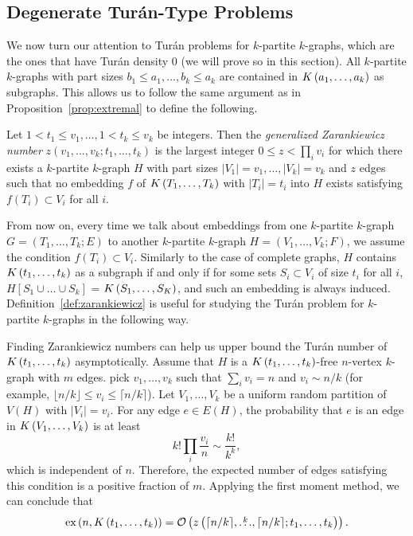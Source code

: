 \subsection{Degenerate Turán-Type Problems}\label{subsec:degenerate}

We now turn our attention to Turán problems for $k$-partite $k$-graphs,
which are the ones that have Turán density $0$ (we will prove so in this section).
All $k$-partite $k$-graphs with part sizes $b_1 \leq a_1, \dots, b_k \leq a_k$
are contained in $K\left(a_1, \dots, a_k\right)$ as subgraphs.
This allows us to follow the same argument as in Proposition~\ref{prop:extremal}
to define the following.

\begin{definition}\label{def:zarankiewicz}
    Let $1 < t_1 \leq v_1, \dots, 1 < t_k \leq v_k$ be integers.
    Then the \emph{generalized Zarankiewicz number} $z(v_1, \dots, v_k; t_1, \dots, t_k)$
    is the largest integer $0 \leq z < \prod_i{ v_i}$ for which there exists a $k$-partite $k$-graph
    $H$ with part sizes $ |V_1| = v_1, \dots, |V_k| = v_k$ and $z$ edges
    such that no embedding $f$ of $K\left(T_1, \dots, T_k\right)$ with $|T_i| = t_i$ into $H$ exists
    satisfying $f(T_i) \subset V_i$ for all $i$.
\end{definition}

From now on, every time we talk about embeddings from one $k$-partite $k$-graph
$G = (T_1, \dots, T_k; E)$ to another $k$-partite $k$-graph $H = (V_1, \dots, V_k; F)$,
we assume the condition $f(T_i) \subset V_i$.
Similarly to the case of complete graphs,
$H$ contains $K\left(t_1, \dots, t_k\right)$ as a subgraph if and only if
for some sets $S_i \subset V_i$ of size $t_i$ for all $i$,
$H[S_1 \cup \dots \cup S_k]$ = $K\left(S_1, \dots, S_K\right)$,
and such an embedding is always induced.
Definition~\ref{def:zarankiewicz} is useful for studying the Turán problem for $k$-partite $k$-graphs
in the following way.

\begin{remark}\label{rem:zar_vs_turan}
    Finding Zarankiewicz numbers can help us upper bound the Turán number of $K\left(t_1, \dots, t_k\right)$ asymptotically.
    Assume that $H$ is a $K\left(t_1, \dots, t_k\right)$-free $n$-vertex $k$-graph with $m$ edges.
    pick $v_1, \dots, v_k$ such that $\sum_{i} v_i = n $ and $v_i \sim n/k $
    (for example, $\lfloor n/k \rfloor \leq v_i \leq \lceil n/k \rceil$).
    Let $V_1, \dots, V_k$ be a uniform random partition of $V(H)$ with $|V_i| = v_i$.
    For any edge $e \in E(H)$, the probability that $e$ is an edge in $K\left(V_1, \dots, V_k\right)$ is
    at least
    \[k! \prod_i \frac{v_i}{n} \sim \frac{k!}{k^k},\]
    which is independent of $n$.
    Therefore, the expected number of edges satisfying this condition is a positive fraction of $m$.
    Applying the first moment method, we can conclude that
    \[
        \text{ex} \left( n, K\left(t_1, \dots, t_k\right) \right) = \mathcal{O}\left(z\left(\lceil n / k \rceil, \overset{k}{\dots}, \lceil n / k \rceil; t_1, \dots, t_k\right)\right).
    \]

\end{remark}


